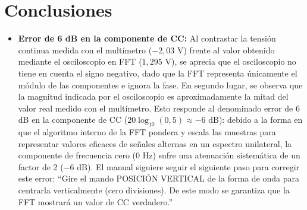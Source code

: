 \section{Conclusiones}


\begin{itemize}
    \item  \textbf {Error de 6 dB en la componente de CC:} Al contrastar la tensión continua medida con el multímetro ($-2,03\text{ V}$) frente al valor obtenido mediante el osciloscopio en FFT ($1,295\text{ V}$), se aprecia que el osciloscopio no tiene en cuenta el signo negativo, dado que la FFT representa únicamente el módulo de las componentes e ignora la fase. En segundo lugar, se observa que la magnitud indicada por el osciloscopio es aproximadamente la mitad del valor real medido con el multímetro. Esto responde al denominado error de 6 dB en la componente de CC ($20\log_{10}(0,5) \approx -6\text{ dB}$): debido a la forma en que el algoritmo interno de la FFT pondera y escala las muestras para representar valores eficaces de señales alternas en un espectro unilateral, la componente de frecuencia cero ($0\text{ Hz}$) sufre una atenuación sistemática de un factor de 2 ($-6\text{ dB}$).
    El manual siguiere seguir el siguiente paso para corregir este error: ``Gire el mando POSICIÓN VERTICAL de la forma de onda 
    para centrarla verticalmente (cero divisiones).
    De este modo se garantiza que la FFT mostrará un valor de CC
    verdadero.''\\
\end{itemize}

